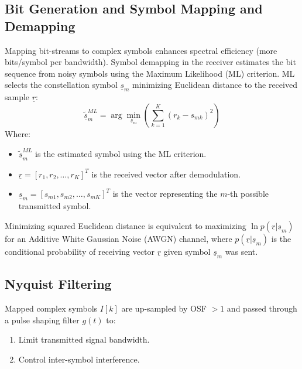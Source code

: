 \documentclass[11pt]{article}
\begin{document}
	\subsection{Bit Generation and Symbol Mapping and Demapping}
	Mapping bit-streams to complex symbols enhances spectral efficiency (more bits/symbol per bandwidth). Symbol demapping in the receiver estimates the bit sequence from noisy symbols using the Maximum Likelihood (ML) criterion. ML selects the constellation symbol $\underline{s}_{m}$ minimizing Euclidean distance to the received sample $\underline{r}$:
	\begin{equation}
		\tilde{\underline{s}}_{m}^{ML} = \arg\min_{\underline{s}_{m}} \left(\sum_{k=1}^{K}(r_{k}-s_{mk})^{2}\right)
	\end{equation}
	Where:
	\begin{itemize}
		\item $\tilde{\underline{s}}_{m}^{ML}$ is the estimated symbol using the ML criterion.
		\item $\underline{r} = [r_1, r_2, \dots, r_K]^T$ is the received vector after demodulation.
		\item $\underline{s}_{m} = [s_{m1}, s_{m2}, \dots, s_{mK}]^T$ is the vector representing the $m$-th possible transmitted symbol.
	\end{itemize}
	Minimizing squared Euclidean distance is equivalent to maximizing $\ln p(\underline{r}|\underline{s}_{m})$ for an Additive White Gaussian Noise (AWGN) channel, where $p(\underline{r}|\underline{s}_{m})$ is the conditional probability of receiving vector $\underline{r}$ given symbol $\underline{s}_m$ was sent.
	
	\subsection{Nyquist Filtering}
	Mapped complex symbols $I[k]$ are up-sampled by OSF $> 1$ and passed through a pulse shaping filter $g(t)$ to:
	\begin{enumerate}
		\item Limit transmitted signal bandwidth.
		\item Control inter-symbol interference.
	\end{enumerate}
	
\end{document}
